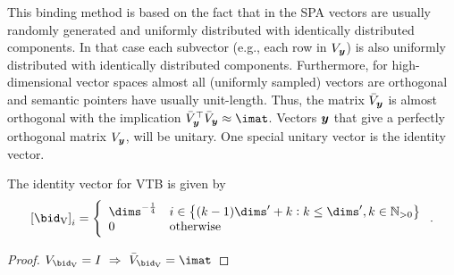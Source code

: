 This binding method is based on the fact that in the SPA vectors are usually randomly generated and uniformly distributed with identically distributed components.
In that case each subvector (e.g., each row in $V_{\bm{y}}$) is also uniformly distributed with identically distributed components.
Furthermore, for high-dimensional vector spaces almost all (uniformly sampled) vectors are orthogonal and semantic pointers have usually unit-length.
Thus, the matrix $\bar{V}_{\bm{y}}$ is almost orthogonal with the implication $\bar{\mat V}_{\vc y}\Tr \bar{\mat V}_{\vc y} \approx \imat$.
Vectors $\bm{y}$ that give a perfectly orthogonal matrix $V_{\bm{y}}$, will be unitary.
One special unitary vector is the identity vector.
\begin{corollary}
    The identity vector for VTB is given by
    \begin{equation}
        \sbr{\bid_{\ped{V}}}_i = \left\{ \begin{array}{ll}
                \dims^{-\frac{1}{4}} & i \in \cbr{(k - 1) \dims' + k : k \leq \dims', k \in \mathbb{N}_{>0}} \\
                0 & \text{otherwise}
        \end{array}\right. \text{.}
    \end{equation}
    \begin{proof}
        $\mat V_{\bid_{\ped{V}}} = I\ \Rightarrow\ \bar{\mat V}_{\bid_{\ped{V}}} = \imat$
    \end{proof}
\end{corollary}


